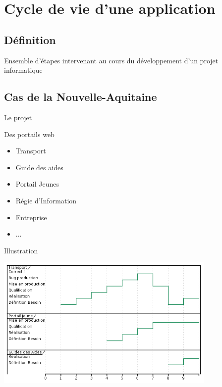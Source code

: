\section[Cycle de vie]{Cycle de vie d'une application}
\subsection{Définition}
\begin{frame}{\subsecname}
	\begin{block}{}
		Ensemble d'étapes intervenant au cours du développement d'un projet informatique
	\end{block}
\end{frame}

\subsection{Cas de la Nouvelle-Aquitaine}

\begin{frame}{Le projet}
	\begin{block}{Des portails web}
		\begin{itemize}
			\item Transport
			\item Guide des aides
			\item Portail Jeunes
			\item Régie d'Information
			\item Entreprise
			\item ...
		\end{itemize}
	\end{block}
\end{frame}

\begin{frame}{Illustration}
	\begin{center}
		\includegraphics[width=0.80\textwidth]{../img/cycle-vie-naq.png}
	\end{center}
\end{frame}